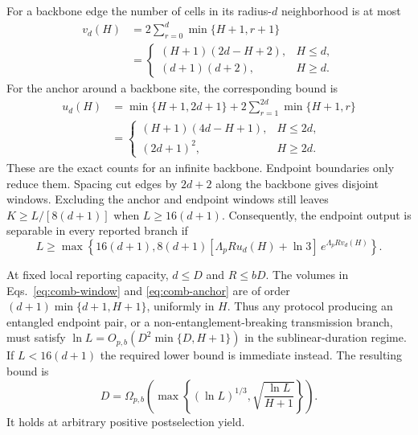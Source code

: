 \documentclass[aps,prl,twocolumn,superscriptaddress,longbibliography,reprint,floatfix]{revtex4-2}
\begin{document}
For a backbone edge the number of cells in its radius-$d$ neighborhood
is at most
\begin{equation}
 \begin{split}
 v_d(H)&=2\sum_{r=0}^{d}\min\{H+1,r+1\}\\
 &=\begin{cases}
 (H+1)(2d-H+2),&H\le d,\\
 (d+1)(d+2),&H\ge d .
 \end{cases}
 \end{split}
 \label{eq:comb-window}
\end{equation}
For the anchor around a backbone site, the corresponding bound is
\begin{equation}
 \begin{split}
 u_d(H)&=\min\{H+1,2d+1\}
             +2\sum_{r=1}^{2d}\min\{H+1,r\}\\
 &=\begin{cases}
 (H+1)(4d-H+1),&H\le2d,\\
 (2d+1)^2,&H\ge2d .
 \end{cases}
 \end{split}
 \label{eq:comb-anchor}
\end{equation}
These are the exact counts for an infinite backbone.  Endpoint
boundaries only reduce them.
Spacing cut edges by $2d+2$ along the backbone gives disjoint windows.
Excluding the anchor and endpoint windows still leaves
$K\ge L/[8(d+1)]$ when $L\ge16(d+1)$.
Consequently, the endpoint output is separable in every reported
branch if
\begin{equation}
 L\ge
 \max\!\left\{16(d+1),
 8(d+1)[\Lambda_pR u_d(H)+\ln3]\,
                 e^{\Lambda_pR v_d(H)}\right\}.
 \label{eq:comb-exact-separability}
\end{equation}

At fixed local reporting capacity, $d\le D$ and $R\le bD$.
The volumes in Eqs.~\eqref{eq:comb-window} and
\eqref{eq:comb-anchor} are of order
$(d+1)\min\{d+1,H+1\}$, uniformly in $H$.
Thus any protocol producing an entangled endpoint pair, or a
non-entanglement-breaking transmission branch, must satisfy
$\ln L=O_{p,b}(D^2\min\{D,H+1\})$ in the sublinear-duration regime.
If $L<16(d+1)$ the required lower bound is immediate instead.
The resulting bound is
\begin{equation}
 D=\Omega_{p,b}\!\left(
 \max\left\{(\ln L)^{1/3},
       \sqrt{\frac{\ln L}{H+1}}\right\}\right).
 \label{eq:comb-depth-lower}
\end{equation}
It holds at arbitrary positive postselection yield.
\end{document}
